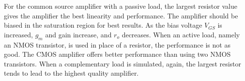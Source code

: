 For the common source amplifier with a passive load, the largest resistor value gives the amplifier the best linearity and performance. The amplifier should be biased in the saturation region for best results. As the bias voltage $V_{GS}$ is increased, $g_m$ and gain increase, and $r_o$ decreases. When an active load, namely an NMOS transistor, is used in place of a resistor, the performance is not as good. The CMOS amplifier offers better performance than using two NMOS transistors. When a complementary load is simulated, again, the largest resistor tends to lead to the highest quality amplifier.

